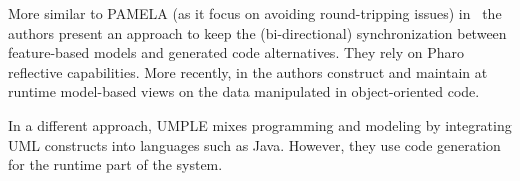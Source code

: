 More similar to PAMELA (as it focus on avoiding round-tripping issues) in~\cite{cavarle2016dynamic} the authors present an approach to keep the (bi-directional) synchronization between feature-based models and generated code alternatives. They rely on Pharo\cite{pharo} reflective capabilities. 
More recently, in \cite{boronat2019} the authors construct and maintain at runtime model-based views on the data manipulated in object-oriented code.



In a different approach, UMPLE\cite{lethbridge2016merging} mixes programming and modeling by integrating UML
constructs into languages such as Java. However, they use code generation for
the runtime part of the system.
